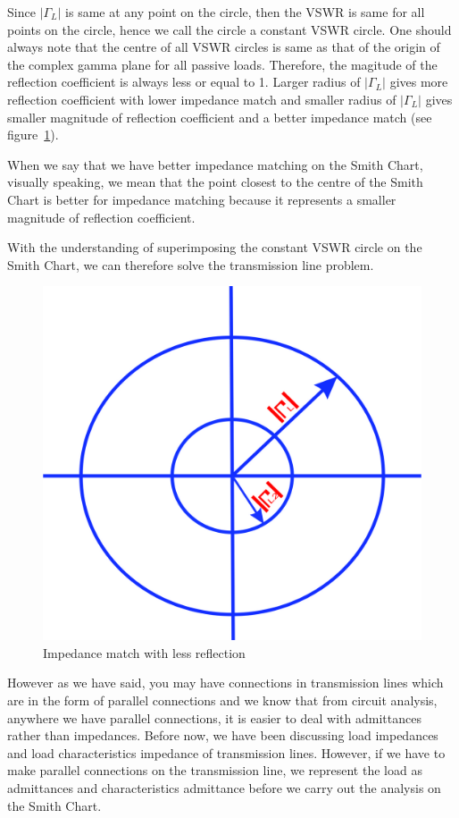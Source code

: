 Since $|\Gamma_L|$ is same at any point on the circle, then the VSWR is same for all points on the circle, hence we call the circle a constant VSWR circle. 
One should always note that the centre of all VSWR circles is same as that of the origin of  the complex gamma plane for all passive loads. Therefore, the magitude of the reflection coefficient is always less or equal to 1. Larger radius of $|\Gamma_L|$ gives more reflection coefficient with lower impedance match and smaller radius of  $|\Gamma_L|$ gives smaller magnitude of reflection coefficient and a better impedance match (see figure~\ref{fig:poiuyfd}).

When we say that we have better impedance matching on the Smith Chart, visually speaking, we mean that the point closest to the centre of the Smith Chart is better for impedance matching because it represents a smaller magnitude of reflection coefficient. 

With the understanding of superimposing the constant VSWR circle on the Smith Chart, we can therefore solve the transmission line problem.
\begin{figure}[h]
\centering
\includegraphics[width=0.57\linewidth]{./graphics/poiuyfd}
\caption{Impedance match with less reflection}
\label{fig:poiuyfd}
\end{figure}

However as we have said, you may have connections in transmission lines which are in the form of parallel connections and we know that from circuit analysis, anywhere we have parallel connections, it is easier to deal with admittances rather than impedances. Before now, we have been discussing load impedances and load characteristics impedance of transmission lines. However, if we have to make parallel connections on the transmission line, we represent the load as admittances and characteristics admittance before we carry out the analysis on the Smith Chart. 

